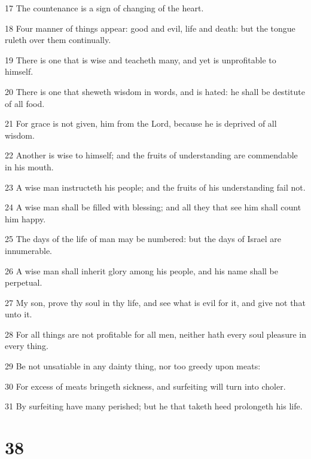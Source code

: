 \par 17 The countenance is a sign of changing of the heart.
\par 18 Four manner of things appear: good and evil, life and death: but the tongue ruleth over them continually.
\par 19 There is one that is wise and teacheth many, and yet is unprofitable to himself.
\par 20 There is one that sheweth wisdom in words, and is hated: he shall be destitute of all food.
\par 21 For grace is not given, him from the Lord, because he is deprived of all wisdom.
\par 22 Another is wise to himself; and the fruits of understanding are commendable in his mouth.
\par 23 A wise man instructeth his people; and the fruits of his understanding fail not.
\par 24 A wise man shall be filled with blessing; and all they that see him shall count him happy.
\par 25 The days of the life of man may be numbered: but the days of Israel are innumerable.
\par 26 A wise man shall inherit glory among his people, and his name shall be perpetual.
\par 27 My son, prove thy soul in thy life, and see what is evil for it, and give not that unto it.
\par 28 For all things are not profitable for all men, neither hath every soul pleasure in every thing.
\par 29 Be not unsatiable in any dainty thing, nor too greedy upon meats:
\par 30 For excess of meats bringeth sickness, and surfeiting will turn into choler.
\par 31 By surfeiting have many perished; but he that taketh heed prolongeth his life.

\chapter{38}

